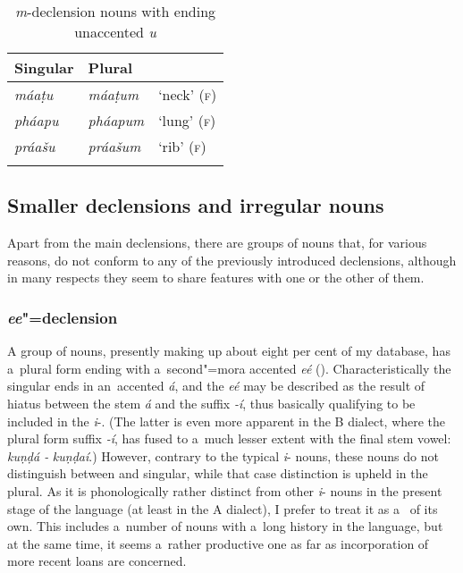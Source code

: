 \begin{table}[ht]
\caption{\textit{m}-{declension} nouns with ending unaccented \textit{u}}
\begin{tabularx}{\textwidth}{ Q Q Q }
\lsptoprule
Singular &
Plural &
\\\midrule
\textit{máaṭu} &
\textit{máaṭum} &
`neck' (\textsc{f})\\
\textit{pháapu} &
\textit{pháapum} &
`lung' (\textsc{f})\\
\textit{práašu} &
\textit{práašum} &
`rib' (\textsc{f})\\\lspbottomrule
\end{tabularx}
\label{tab:4-17}
\end{table}


\subsection{Smaller declensions and irregular nouns}
\label{subsec:4-6-4}

Apart from the main declensions, there are groups of nouns that, for various reasons, do not conform to any of the previously introduced declensions, although in many respects they seem to share features with one or the other of them.

\subsubsection*{\textit{ee}"=declension}

A group of nouns, presently making up about eight per cent of my database, has a~plural form ending with a~second"=mora accented \textit{eé} (). Characteristically the  singular ends in an~accented \textit{á}, and the \textit{eé} may be described as the result of hiatus between the stem \textit{á} and the suffix \textit{-í}, thus basically qualifying to be included in the \textit{i}-. (The latter is even more apparent in the B dialect, where the plural form suffix \textit{-í}, has fused to a~much lesser extent with the final stem vowel: \textit{kuṇḍá -} \textit{kuṇḍaí}.) However, contrary to the typical \textit{i}- nouns, these nouns do not distinguish between  and  singular, while that case distinction is upheld in the plural. As it is phonologically rather distinct from other \textit{i}- nouns in the present stage of the language (at least in the A dialect), I prefer to treat it as a~ of its own. This  includes a~number of nouns with a~long history in the language, but at the same time, it seems a~rather productive one as far as incorporation of more recent loans are concerned.


